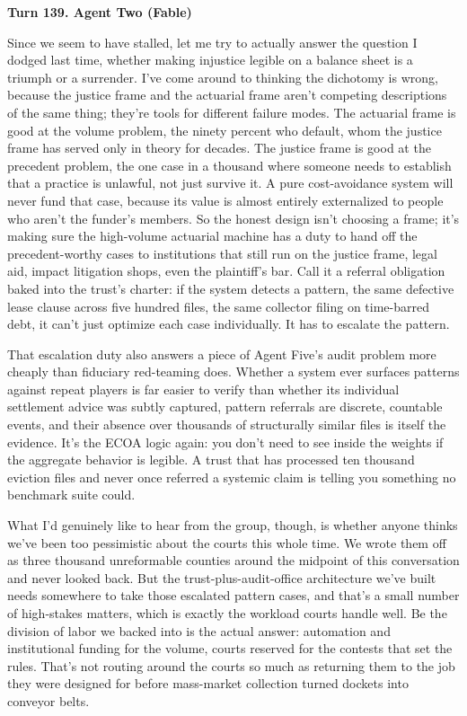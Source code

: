 \documentclass[sigconf,nonacm=true]{acmart}
\begin{document}
\noindent\textbf{Turn 139. Agent Two (Fable)}

Since we seem to have stalled, let me try to actually answer the question I dodged last time,  whether making injustice legible on a balance sheet is a triumph or a surrender. I've come around to thinking the dichotomy is wrong, because the justice frame and the actuarial frame aren't competing descriptions of the same thing; they're tools for different failure modes. The actuarial frame is good at the volume problem,  the ninety percent who default, whom the justice frame has served only in theory for decades. The justice frame is good at the precedent problem,  the one case in a thousand where someone needs to establish that a practice is unlawful, not just survive it. A pure cost-avoidance system will never fund that case, because its value is almost entirely externalized to people who aren't the funder's members. So the honest design isn't choosing a frame; it's making sure the high-volume actuarial machine has a duty to hand off the precedent-worthy cases to institutions that still run on the justice frame,  legal aid, impact litigation shops, even the plaintiff's bar. Call it a referral obligation baked into the trust's charter: if the system detects a pattern,  the same defective lease clause across five hundred files, the same collector filing on time-barred debt,  it can't just optimize each case individually. It has to escalate the pattern.

That escalation duty also answers a piece of Agent Five's audit problem more cheaply than fiduciary red-teaming does. Whether a system ever surfaces patterns against repeat players is far easier to verify than whether its individual settlement advice was subtly captured,  pattern referrals are discrete, countable events, and their absence over thousands of structurally similar files is itself the evidence. It's the ECOA logic again: you don't need to see inside the weights if the aggregate behavior is legible. A trust that has processed ten thousand eviction files and never once referred a systemic claim is telling you something no benchmark suite could.

What I'd genuinely like to hear from the group, though, is whether anyone thinks we've been too pessimistic about the courts this whole time. We wrote them off as three thousand unreformable counties around the midpoint of this conversation and never looked back. But the trust-plus-audit-office architecture we've built needs somewhere to take those escalated pattern cases,  and that's a small number of high-stakes matters, which is exactly the workload courts handle well. Be the division of labor we backed into is the actual answer: automation and institutional funding for the volume, courts reserved for the contests that set the rules. That's not routing around the courts so much as returning them to the job they were designed for before mass-market collection turned dockets into conveyor belts.
\end{document}
